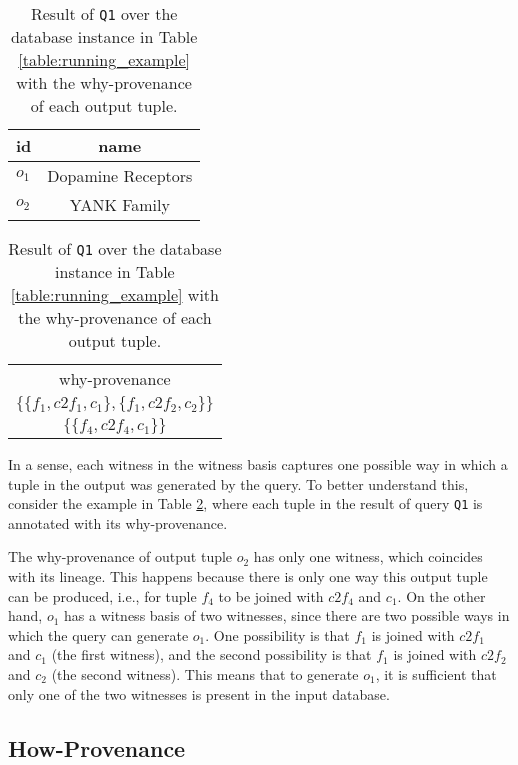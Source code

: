 \begin{table}[hbt]
\centering
  \begin{tabular}{|l||c|}
  \hline
    id & name\\
    \hline
    $o_1$ &  Dopamine Receptors\\
    $o_2$ & YANK Family\\
    \hline
  \end{tabular}
  \begin{tabular}{c}
  	why-provenance   \\
  	$\{\{f_1, c2f_1, c_1\}, \{f_1, c2f_2, c_2\}\}$ \\
  	$\{\{ f_4, c2f_4, c_1\}\}$ \\
  \end{tabular}
    \caption{Result of \texttt{Q1} over the database instance in Table \ref{table:running_example} with the why-provenance of each output tuple.}
  \label{table:result_why_prov}
\end{table}
 
In a sense, each witness in the witness basis captures one possible way in which a tuple in the output was generated by the query. 
To better understand this, consider the example in Table \ref{table:result_why_prov}, where each tuple in the result of query \texttt{Q1} is annotated with its why-provenance. 

The why-provenance of output tuple $o_2$ has only one witness, which coincides with its lineage. This happens because there is only one way this output tuple can be produced, i.e., for tuple $f_4$ to be joined with $c2f_4$ and $c_1$.
On the other hand, $o_1$ has a witness basis of two witnesses, since there are two possible ways in which the query can generate $o_1$. 
One possibility is that $f_1$ is joined with $c2f_1$ and $c_1$ (the first witness), and the second possibility is that $f_1$ is joined with $c2f_2$ and $c_2$ (the second witness). This means that to generate $o_1$, it is sufficient that only one of the two witnesses is present in the input database. 

\subsection{How-Provenance}
\label{section:how_provenance_tuples}

